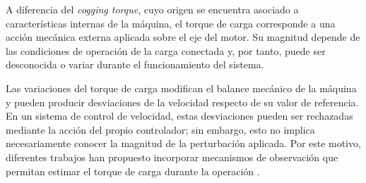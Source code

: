 %
%
%
%
%
%
%
%
%
%
%
%
%
%

A diferencia del \textit{cogging torque}, cuyo origen se encuentra asociado
a características internas de la máquina, el torque de carga corresponde a
una acción mecánica externa aplicada sobre el eje del motor. Su magnitud
depende de las condiciones de operación de la carga conectada y, por tanto,
puede ser desconocida o variar durante el funcionamiento del sistema.

Las variaciones del torque de carga modifican el balance mecánico de la
máquina y pueden producir desviaciones de la velocidad respecto de su valor
de referencia. En un sistema de control de velocidad, estas desviaciones
pueden ser rechazadas mediante la acción del propio controlador; sin embargo,
esto no implica necesariamente conocer la magnitud de la perturbación aplicada.
Por este motivo, diferentes trabajos han propuesto incorporar mecanismos de
observación que permitan estimar el torque de carga durante la operación
\cite{yuSimultaneousStateDisturbances2025,
horvathLoadTorquePermanent2023,
picatosteruilopeModellingControlStepper2014,
deangeloControlParaMaquinas2004}.

